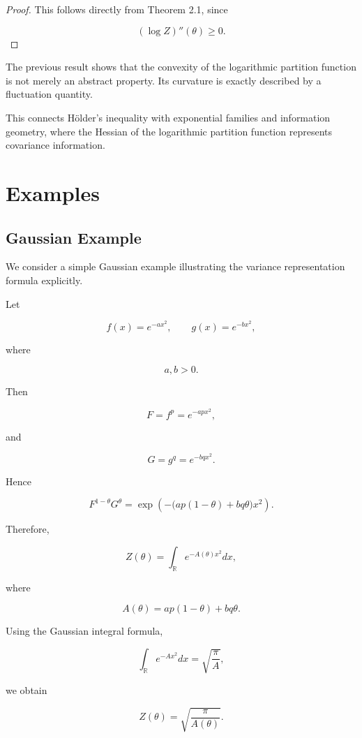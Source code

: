\documentclass[11pt]{amsart}
\begin{document}
\begin{proof}

This follows directly from Theorem 2.1, since

\[
(\log Z)''(\theta)\geq0.
\]

\end{proof}


The previous result shows that the convexity of the logarithmic
partition function is not merely an abstract property. Its curvature
is exactly described by a fluctuation quantity.

This connects Hölder's inequality with exponential families and
information geometry, where the Hessian of the logarithmic
partition function represents covariance information.



\section{Examples}


\subsection{Gaussian Example}


We consider a simple Gaussian example illustrating the variance
representation formula explicitly.

Let

\[
f(x)=e^{-ax^2},
\qquad
g(x)=e^{-bx^2},
\]

where

\[
a,b>0 .
\]

Then

\[
F=f^p=e^{-apx^2},
\]

and

\[
G=g^q=e^{-bqx^2}.
\]

Hence

\[
F^{1-\theta}G^\theta
=
\exp
\left(
-
\big(
ap(1-\theta)+bq\theta
\big)x^2
\right).
\]

Therefore,

\[
Z(\theta)
=
\int_{\mathbb R}
e^{-A(\theta)x^2}dx,
\]

where

\[
A(\theta)
=
ap(1-\theta)+bq\theta .
\]

Using the Gaussian integral formula,

\[
\int_{\mathbb R}e^{-Ax^2}dx
=
\sqrt{\frac{\pi}{A}},
\]

we obtain

\[
Z(\theta)
=
\sqrt{
\frac{\pi}{A(\theta)}
}.
\]
\end{document}
